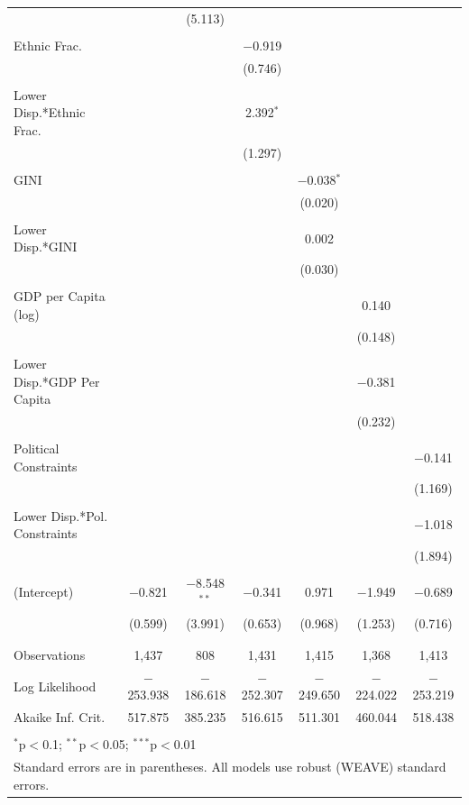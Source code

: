 \documentclass[a4paper]{article}\usepackage[]{graphicx}\usepackage[]{color}
\begin{document}
\begin{table}
\begin{center}
{\begin{tabular}{@{\extracolsep{5pt}}lcccccc}
  &  & (5.113) &  &  &  &  \\ 
  & & & & & & \\ 
 Ethnic Frac. &  &  & $-$0.919 &  &  &  \\ 
  &  &  & (0.746) &  &  &  \\ 
  & & & & & & \\ 
 Lower Disp.*Ethnic Frac. &  &  & 2.392$^{*}$ &  &  &  \\ 
  &  &  & (1.297) &  &  &  \\ 
  & & & & & & \\ 
 GINI &  &  &  & $-$0.038$^{*}$ &  &  \\ 
  &  &  &  & (0.020) &  &  \\ 
  & & & & & & \\ 
 Lower Disp.*GINI &  &  &  & 0.002 &  &  \\ 
  &  &  &  & (0.030) &  &  \\ 
  & & & & & & \\ 
 GDP per Capita (log) &  &  &  &  & 0.140 &  \\ 
  &  &  &  &  & (0.148) &  \\ 
  & & & & & & \\ 
 Lower Disp.*GDP Per Capita &  &  &  &  & $-$0.381 &  \\ 
  &  &  &  &  & (0.232) &  \\ 
  & & & & & & \\ 
 Political Constraints &  &  &  &  &  & $-$0.141 \\ 
  &  &  &  &  &  & (1.169) \\ 
  & & & & & & \\ 
 Lower Disp.*Pol. Constraints &  &  &  &  &  & $-$1.018 \\ 
  &  &  &  &  &  & (1.894) \\ 
  & & & & & & \\ 
 (Intercept) & $-$0.821 & $-$8.548$^{**}$ & $-$0.341 & 0.971 & $-$1.949 & $-$0.689 \\ 
  & (0.599) & (3.991) & (0.653) & (0.968) & (1.253) & (0.716) \\ 
  & & & & & & \\ 
\hline \\[-1.8ex] 
Observations & 1,437 & 808 & 1,431 & 1,415 & 1,368 & 1,413 \\ 
Log Likelihood & $-$253.938 & $-$186.618 & $-$252.307 & $-$249.650 & $-$224.022 & $-$253.219 \\ 
Akaike Inf. Crit. & 517.875 & 385.235 & 516.615 & 511.301 & 460.044 & 518.438 \\ 
\hline 
\hline \\[-1.8ex] 
\multicolumn{7}{l}{$^{*}$p$<$0.1; $^{**}$p$<$0.05; $^{***}$p$<$0.01} \\ 
\multicolumn{7}{l}{Standard errors are in parentheses. All models use robust (WEAVE) standard errors.} \\ 
\end{tabular} 

    }
    \end{center}
\end{table}
\end{document}
